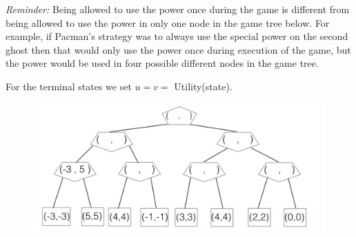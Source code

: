 \documentclass[12pt]{article}
\theoremstyle{case}
\begin{document}
{\em Reminder:} Being allowed to use the power once during the game is different from being allowed to use the power in only one node in the game tree below. For example, if Pacman’s strategy was to always use the special power on the second ghost then that would only use the power once during execution of the game, but the power would be used in four possible different nodes in the game tree.

For the terminal states we set $u = v = $ Utility(state).

\begin{figure}[h]
\includegraphics[width=1.\textwidth]{assignment3_2.jpg}
\centering
\end{figure}
 
\end{document}
